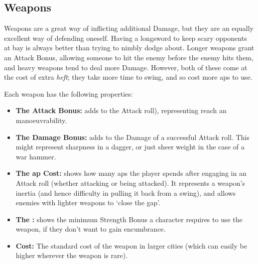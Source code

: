 \begin{multicols}{2}

\subsection{Weapons}

\noindent
Weapons are a great way of inflicting additional Damage, but they are an equally excellent way of defending oneself.
Having a longsword to keep scary opponents at bay is always better than trying to nimbly dodge about.
Longer weapons grant an Attack Bonus, allowing someone to hit the enemy before the enemy hits them, and heavy weapons tend to deal more Damage.
However, both of these come at the cost of extra \emph{heft}; they take more time to swing, and so cost more \glspl{ap} to use.

Each weapon has the following properties:

\begin{itemize}

  \item
  \textbf{The Attack Bonus:} adds to the Attack roll), representing reach an manoeuvrability.
  \item
  \textbf{The Damage Bonus:} adds to the Damage of a successful Attack roll.
  This might represent sharpness in a dagger, or just sheer weight in the case of a war hammer.
  \item
  \textbf{The \Gls{ap} Cost:} shows how many \glspl{ap} the player spends after engaging in an Attack roll (whether attacking or being attacked).
  It represents a weapon's inertia (and hence difficulty in pulling it back from a swing), and allows enemies with lighter weapons to `close the gap'.
  \item
  \textbf{The :} shows the minimum Strength Bonus a character requires to use the weapon, if they don't want to gain encumbrance.
  \item
  \textbf{Cost:} The standard cost of the weapon in larger cities (which can easily be higher wherever the weapon is rare).

\end{itemize}

\end{multicols}

\weaponsChart

\label{weaponschart}

